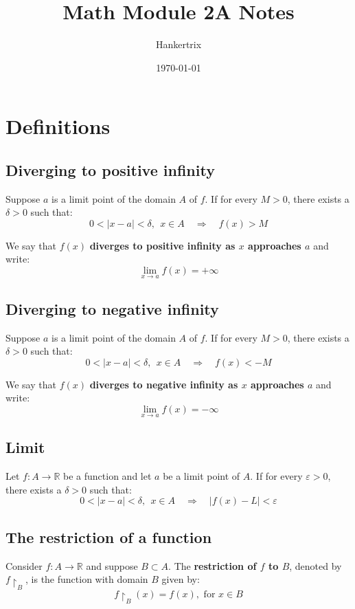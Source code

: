 \documentclass[11pt]{article}
\author{Hankertrix}
\date{\today}
\title{Math Module 2A Notes}
\begin{document}
\maketitle
\setcounter{tocdepth}{2}
\tableofcontents \clearpage\section{Definitions}
\label{sec:org4909cc5}

\subsection{Diverging to positive infinity}
\label{sec:org89b9298}
Suppose \(a\) is a limit point of the domain \(A\) of \(f\). If for every \(M > 0\), there exists a \(\delta > 0\) such that:
\[0 < |x - a| < \delta, \ \ x \in A \quad \Rightarrow \quad f(x) > M\]

We say that \(f(x)\) \textbf{diverges to positive infinity as \(x\) approaches \(a\)} and write:
\[\lim_{x \rightarrow a} f(x) = + \infty\]
\subsection{Diverging to negative infinity}
\label{sec:org29aae96}
Suppose \(a\) is a limit point of the domain \(A\) of \(f\). If for every \(M > 0\), there exists a \(\delta > 0\) such that:
\[0 < |x - a| < \delta, \ \ x \in A \quad \Rightarrow \quad f(x) < -M\]

We say that \(f(x)\) \textbf{diverges to negative infinity as \(x\) approaches \(a\)} and write:
\[\lim_{x \rightarrow a} f(x) = - \infty\]
\subsection{Limit}
\label{sec:orgd3341d4}
Let \(f : A \rightarrow \mathbb{R}\) be a function and let \(a\) be a limit point of \(A\). If for every \(\varepsilon > 0\), there exists a \(\delta > 0\) such that:
\[0 < |x - a| < \delta, \ \ x \in A \quad \Rightarrow \quad |f(x) - L| < \varepsilon\]
\subsection{The restriction of a function}
\label{sec:org6aa1010}
Consider \(f : A \rightarrow \mathbb{R}\) and suppose \(B \subset A\). The \textbf{restriction of \(f\) to \(B\)}, denoted by \(f \restriction_B\), is the function with domain \(B\) given by:
\[f \restriction_B (x) = f(x), \text{ for } x \in B\]
\end{document}
